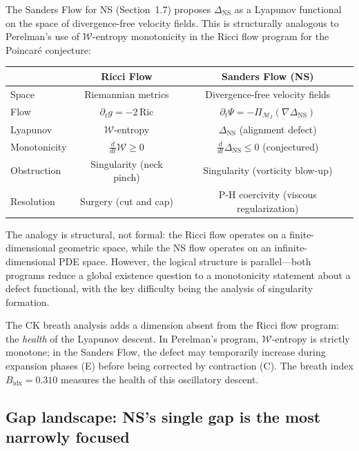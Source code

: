 \documentclass[11pt]{article}
\theoremstyle{definition}
\theoremstyle{remark}
\begin{document}
The Sanders Flow for NS (Section~1.7) proposes $\Delta_{\mathrm{NS}}$ as a
Lyapunov functional on the space of divergence-free velocity fields.  This
is structurally analogous to Perelman's use of $\mathcal{W}$-entropy
monotonicity in the Ricci flow program for the Poincar\'e conjecture:

\begin{center}
\begin{tabular}{lcc}
\hline
& \textbf{Ricci Flow} & \textbf{Sanders Flow (NS)} \\
\hline
Space & Riemannian metrics & Divergence-free velocity fields \\
Flow & $\partial_t g = -2\,\mathrm{Ric}$ & $\partial_t \Psi = -\Pi_{\mathcal{M}_I}(\nabla\Delta_{\mathrm{NS}})$ \\
Lyapunov & $\mathcal{W}$-entropy & $\Delta_{\mathrm{NS}}$ (alignment defect) \\
Monotonicity & $\frac{d}{dt}\mathcal{W} \geq 0$ & $\frac{d}{dt}\Delta_{\mathrm{NS}} \leq 0$ (conjectured) \\
Obstruction & Singularity (neck pinch) & Singularity (vorticity blow-up) \\
Resolution & Surgery (cut and cap) & P-H coercivity (viscous regularization) \\
\hline
\end{tabular}
\end{center}

\noindent
The analogy is structural, not formal: the Ricci flow operates on a finite-dimensional
geometric space, while the NS flow operates on an infinite-dimensional PDE space.
However, the logical structure is parallel---both programs reduce a global existence
question to a monotonicity statement about a defect functional, with the key difficulty
being the analysis of singularity formation.

The CK breath analysis adds a dimension absent from the Ricci flow program: the
\emph{health} of the Lyapunov descent.  In Perelman's program, $\mathcal{W}$-entropy
is strictly monotone; in the Sanders Flow, the defect may temporarily increase during
expansion phases (E) before being corrected by contraction (C).  The breath index
$B_{\mathrm{idx}} = 0.310$ measures the health of this oscillatory descent.

\subsection{Gap landscape: NS's single gap is the most narrowly focused}
\end{document}
